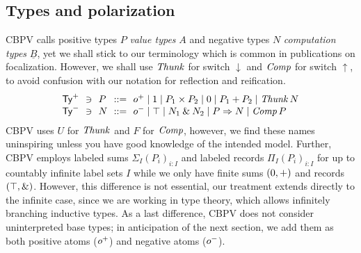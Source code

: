 \documentclass[sigconf,screen,fleqn]{acmart} %
\begin{document}
\subsection{Types and polarization}

CBPV calls positive types $P$ \emph{value types} $A$ and negative
types $N$
\emph{computation types} $\underline B$,
yet we shall stick to our terminology
which is common in publications on focalization.
However, we shall use $\mathit{Thunk}$ for switch $\downarrow$ and $\mathit{Comp}$ for
switch $\uparrow$, to avoid confusion with our notation for reflection
and reification.
\[
\begin{array}{l@{~~}l@{~~}l@{~~}r@{~~}l}%
  \PTy & \ni & P & ::= & \patom
    \mid \tyone \mid P_1 \times P_2
    \mid \tyzero \mid P_1 + P_2
    \mid \Thunk N
\\
  \NTy & \ni & N & ::= & \natom
    \mid \top \mid N_1 \ntimes N_2
    \mid P \To N
    \mid \Comp P
\\
\end{array}
\]
CBPV uses $U$ for $\mathit{Thunk}$ and $F$ for $\mathit{Comp}$, however, we find
these names uninspiring unless you have good knowledge of the intended
model.  Further, CBPV \cite{levy:hosc06}
employs labeled sums $\Sigma_I (P_i)_{i : I}$
and labeled records $\Pi_I (P_i)_{i : I}$ for up to countably infinite
label sets $I$ while we only have finite sums $(0,+)$ and
records $(\top,\mathbin{\&})$.  However, this difference is not essential,
our treatment extends directly to the infinite case, since we are
working in type theory, which allows infinitely branching inductive
types.
As a last difference, CBPV does not consider uninterpreted base types; in
anticipation of the next section, we add them as both positive atoms
($o^+$) and negative atoms ($o^-$).
\end{document}
